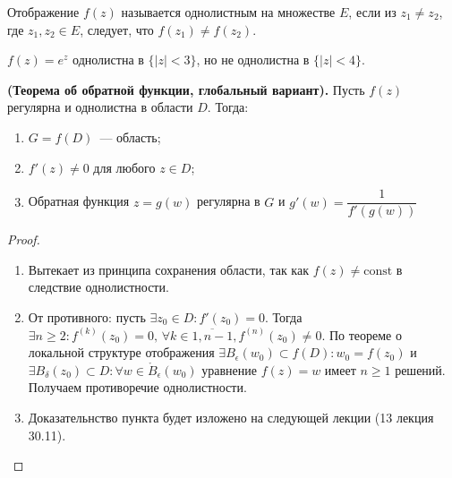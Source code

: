\begin{definition}
Отображение \(f(z)\) называется однолистным на множестве \(E\), если из \(z_1 \ne z_2\), где 
\(z_1, z_2 \in E\), следует, что \(f(z_1) \ne f(z_2)\).
\end{definition}

\begin{example}
\(f(z) = e^z\) однолистна в \(\{|z|<3\}\), но не однолистна в \(\{|z| < 4\}\).
\end{example}

\begin{statement}
\textbf{(Теорема об обратной функции, глобальный вариант).} Пусть \(f(z)\) регулярна и однолистна в
области \(D\). Тогда:
\begin{enumerate}[wide=20pt, itemsep=0ex]
\item \(G = f(D)\)~--- область;
\item \(f'(z) \ne 0 \) для любого \(z \in D\);
\item Обратная функция \(z = g(w)\) регулярна в \(G\) и \(g'(w) = \dfrac{1}{f'(g(w))}\)
\end{enumerate}
\end{statement}

\begin{proof}
\begin{enumerate}[wide=20pt, itemsep=0ex]
\item Вытекает из принципа сохранения области, так как \(f(z) \ne \mathrm{const}\) в следствие
    однолистности.
\item От противного: пусть \(\exists z_0 \in D\colon f'(z_0) = 0\). Тогда \(\exists n \ge 2\colon 
    f^{(k)}(z_0) = 0,\, \forall k \in \overline{1, n-1}, f^{(n)}(z_0) \ne 0\). По теореме о
    локальной структуре отображения \(\exists B_\epsilon(w_0)\subset f(D)\colon w_0 = f(z_0)\) и \(\exists 
    B_\delta(z_0) \subset D\colon \forall w \in \mathring{B}_\epsilon(w_0)\) уравнение \(f(z) = w\)
    имеет \(n \ge 1\) решений. Получаем противоречие однолистности.
\item Доказательнство пункта будет изложено на следующей лекции (13 лекция 30.11).
\end{enumerate}
\end{proof}